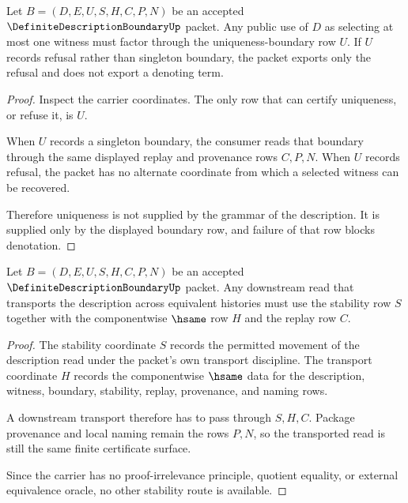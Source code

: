 \begin{theorem}
\label{thm:definite-description-boundary-uniqueness-route}
Let $B=(D,E,U,S,H,C,P,N)$ be an accepted $\DefiniteDescriptionBoundaryUp$ packet. Any public use of $D$ as selecting at most one witness must factor through the uniqueness-boundary row $U$. If $U$ records refusal rather than singleton boundary, the packet exports only the refusal and does not export a denoting term.
\end{theorem}
\begin{proof}
Inspect the carrier coordinates. The only row that can certify uniqueness, or refuse it, is $U$.

When $U$ records a singleton boundary, the consumer reads that boundary through the same displayed replay and provenance rows $C,P,N$. When $U$ records refusal, the packet has no alternate coordinate from which a selected witness can be recovered.

Therefore uniqueness is not supplied by the grammar of the description. It is supplied only by the displayed boundary row, and failure of that row blocks denotation.
\end{proof}

\begin{theorem}
\label{thm:definite-description-boundary-stability-route}
Let $B=(D,E,U,S,H,C,P,N)$ be an accepted $\DefiniteDescriptionBoundaryUp$ packet. Any downstream read that transports the description across equivalent histories must use the stability row $S$ together with the componentwise $\hsame$ row $H$ and the replay row $C$.
\end{theorem}
\begin{proof}
The stability coordinate $S$ records the permitted movement of the description read under the packet's own transport discipline. The transport coordinate $H$ records the componentwise $\hsame$ data for the description, witness, boundary, stability, replay, provenance, and naming rows.

A downstream transport therefore has to pass through $S,H,C$. Package provenance and local naming remain the rows $P,N$, so the transported read is still the same finite certificate surface.

Since the carrier has no proof-irrelevance principle, quotient equality, or external equivalence oracle, no other stability route is available.
\end{proof}

